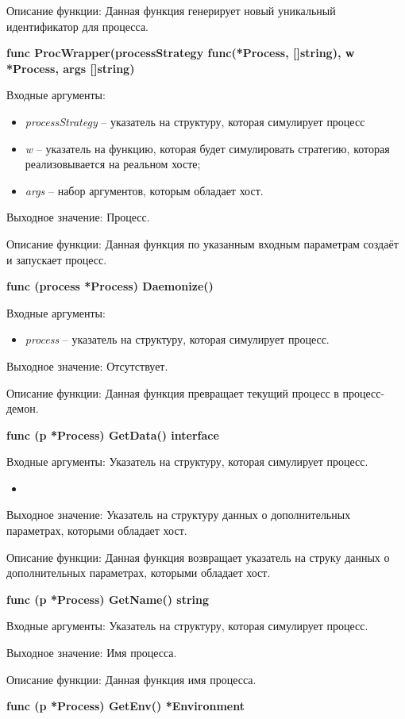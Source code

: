 Описание функции: Данная функция генерирует новый уникальный идентификатор для процесса.

\textbf{func ProcWrapper(processStrategy func(*Process, []string), w *Process, args []string)}

Входные аргументы: 
\begin{itemize}
	\item \textit{processStrategy} -- указатель на структуру, которая симулирует процесс
	\item \textit{w} -- указатель на функцию, которая будет симулировать стратегию, которая реализовывается на реальном хосте;  
	\item \textit{args} -- набор аргументов, которым обладает хост.
\end{itemize}

Выходное значение: Процесс.

Описание функции: Данная функция по указанным входным параметрам создаёт и запускает процесс.


\textbf{func (process *Process) Daemonize() }

Входные аргументы: 
\begin{itemize}
	\item \textit{process} -- указатель на структуру, которая симулирует процесс.
\end{itemize}
Выходное значение: Отсутствует.

Описание функции: Данная функция превращает текущий процесс в процесс-демон.


\textbf{func (p *Process) GetData() interface}

Входные аргументы: Указатель на структуру, которая симулирует процесс.
\begin{itemize}
	\item 
\end{itemize}
Выходное значение: Указатель на структуру данных о дополнительных параметрах, которыми обладает хост.

Описание функции: Данная функция возвращает указатель на струку данных о дополнительных параметрах, которыми обладает хост.


\textbf{func (p *Process) GetName() string}

Входные аргументы: Указатель на структуру, которая симулирует процесс.

Выходное значение: Имя процесса.

Описание функции: Данная функция имя процесса.

\textbf{func (p *Process) GetEnv() *Environment}


